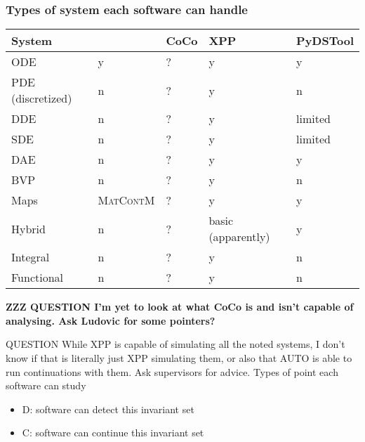 \documentclass[a4paper,twoside]{article}
\newenvironment{NOTE}{\color{red}\bfseries ZZZ}
\newcommand{\matcont}{\textsc{MatCont}}
\newcommand{\matcontm}{\textsc{MatContM}}
\begin{document}
\subsubsection{Types of system each software can handle}
\label{sec:orgdf94940}


\begin{center}
\begin{tabular}{lllll}
System & \matcont{} & CoCo & XPP & PyDSTool\\
\hline
ODE & y & ? & y & y\\
PDE (discretized) & n & ? & y & n\\
DDE & n & ? & y & limited\\
SDE & n & ? & y & limited\\
DAE & n & ? & y & y\\
BVP & n & ? & y & n\\
Maps & \matcontm{} & ? & y & y\\
Hybrid & n & ? & basic (apparently) & y\\
Integral & n & ? & y & n\\
Functional & n & ? & y & n\\
\end{tabular}
\end{center}

\begin{NOTE}
QUESTION I'm yet to look at what CoCo is and isn't capable of analysing. Ask Ludovic for some pointers?

QUESTION While XPP is capable of simulating all the noted systems, I don't know if that is literally just XPP simulating them, or also that AUTO is able to run continuations with them. Ask supervisors for advice.
\end{NOTE}

\subsubsection{Types of point each software can study}
\label{sec:org6fbd124}

\begin{itemize}
\item D: software can detect this invariant set
\item C: software can continue this invariant set
\end{itemize}
\end{document}
